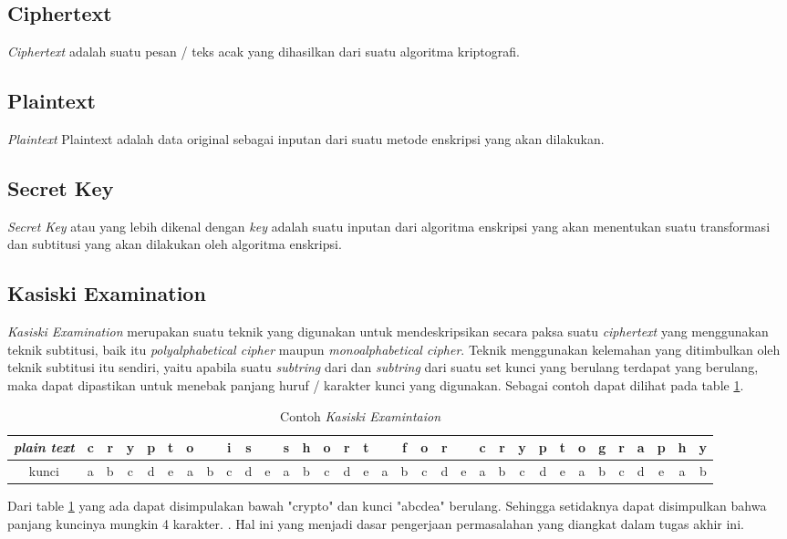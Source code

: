 	\subsection{Ciphertext}
	\textit{Ciphertext} adalah suatu pesan / teks acak yang dihasilkan dari suatu algoritma kriptografi.\cite{william_crytography_2011}
	
	\subsection{Plaintext}
	\textit{Plaintext} Plaintext adalah data original sebagai inputan dari suatu metode enskripsi yang akan dilakukan.\cite{william_crytography_2011}
	
	\subsection{Secret Key}
	\textit{Secret Key} atau yang lebih dikenal dengan \textit{key} adalah suatu inputan dari algoritma enskripsi yang akan menentukan suatu transformasi dan subtitusi yang akan dilakukan oleh algoritma enskripsi.\cite{william_crytography_2011}
	
	 \subsection{Kasiski Examination}
	 \textit{Kasiski Examination} merupakan suatu teknik yang digunakan untuk mendeskripsikan secara paksa suatu \textit{ciphertext} yang menggunakan teknik subtitusi, baik itu \textit{polyalphabetical cipher} maupun \textit{monoalphabetical cipher}. Teknik menggunakan kelemahan yang ditimbulkan oleh teknik subtitusi itu sendiri, yaitu apabila suatu \textit{subtring} dari \plaintext dan \textit{subtring} dari suatu set kunci yang berulang terdapat yang berulang, maka dapat dipastikan untuk menebak panjang huruf / karakter kunci yang digunakan. Sebagai contoh dapat dilihat pada table \ref{tab:kasiski examination}.
	 \begin{table}[H]
		\centering
		\begin{tabular}   {|c|c|c|c|c|c|c|c|c|c|c|c|c|c|c|c|c|c|c|c|c|c|c|c|c|c|c|c|c|c|c|c|c|}\hline
		\textit{plain text}&c&r&y&p&t&o& &i&s& &s&h&o&r&t& &f&o&r& &c&r&y&p&t&o&g&r&a&p&h&y\\ \hline
		kunci&a&b&c&d&e&a&b&c&d&e&a&b&c&d&e&a&b&c&d&e&a&b&c&d&e&a&b&c&d&e&a&b\\ \hline
		\end{tabular}
		\caption{Contoh \textit{Kasiski Examintaion}}
		\label{tab:kasiski examination}
	\end{table}
	Dari table \ref{tab:kasiski examination} yang ada dapat disimpulakan bawah \plaintext "crypto" dan kunci "abcdea" berulang. Sehingga setidaknya dapat disimpulkan bahwa panjang kuncinya mungkin 4 karakter. \cite{noauthor_kasiski_nodate}. Hal ini yang menjadi dasar pengerjaan permasalahan yang diangkat dalam tugas akhir ini.
